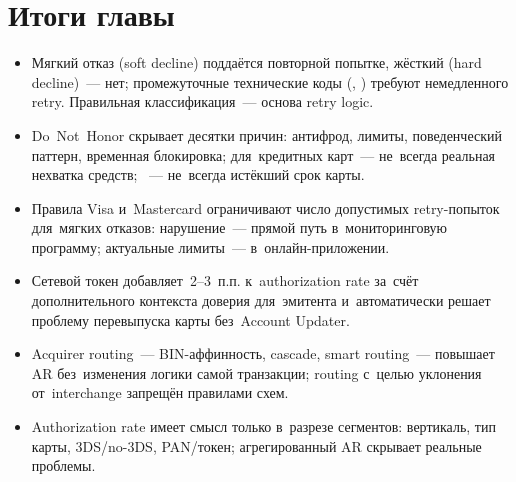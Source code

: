 \section*{Итоги главы}

\begin{itemize}
  \item Мягкий отказ (soft decline) поддаётся повторной попытке,
        жёсткий (hard decline)~--- нет; промежуточные технические коды
        (, ) требуют немедленного retry. Правильная
        классификация~--- основа retry logic.
  \item {} Do~Not~Honor скрывает десятки причин: антифрод,
        лимиты, поведенческий паттерн, временная блокировка; 
        для~кредитных карт~--- не~всегда реальная нехватка средств;
        ~--- не~всегда истёкший срок карты.
  \item Правила Visa и~Mastercard ограничивают число допустимых
        retry-попыток для~мягких отказов: нарушение~--- прямой путь
        в~мониторинговую программу; актуальные лимиты~--- в~онлайн-приложении.
  \item Сетевой токен добавляет~2--3~п.п. к~authorization rate
        за~счёт дополнительного контекста доверия для~эмитента
        и~автоматически решает проблему перевыпуска карты без~Account
        Updater.
  \item Acquirer routing~--- BIN-аффинность, cascade, smart routing~---
        повышает AR без~изменения логики самой транзакции; routing
        с~целью уклонения от~interchange запрещён правилами схем.
  \item Authorization rate имеет смысл только в~разрезе сегментов:
        вертикаль, тип карты, 3DS/no-3DS, PAN/токен; агрегированный
        AR скрывает реальные проблемы.
\end{itemize}
